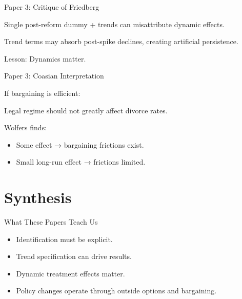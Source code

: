\documentclass[aspectratio=169]{beamer}
\begin{document}
\begin{frame}{Paper 3: Critique of Friedberg}

Single post-reform dummy + trends
can misattribute dynamic effects.

Trend terms may absorb post-spike declines,
creating artificial persistence.

Lesson:
Dynamics matter.

\end{frame}

\begin{frame}{Paper 3: Coasian Interpretation}

If bargaining is efficient:

Legal regime should not greatly affect divorce rates.

Wolfers finds:

\begin{itemize}
    \item Some effect → bargaining frictions exist.
    \item Small long-run effect → frictions limited.
\end{itemize}

\end{frame}

\section{Synthesis}

\begin{frame}{What These Papers Teach Us}

\begin{itemize}
    \item Identification must be explicit.
    \item Trend specification can drive results.
    \item Dynamic treatment effects matter.
    \item Policy changes operate through outside options and bargaining.
\end{itemize}
\end{frame}
\end{document}
